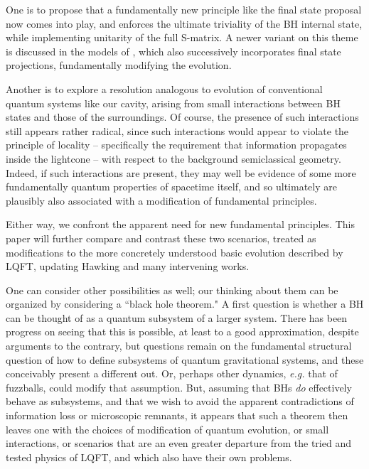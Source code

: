 \documentclass[11pt]{article}
\numberwithin{equation}{section}
\begin{document}
One is to propose that a fundamentally new principle like  the final state proposal\cite{ABL,Griffiths:1984rx,Gell-Mann:1991kdm} now comes into play\cite{HoMa}, and enforces the ultimate triviality of the BH internal state, while implementing unitarity of the full S-matrix.  A newer variant on this theme is discussed in the models of \cite{AEHPV}, which also successively incorporates final state projections, fundamentally modifying the evolution.

Another is to explore a resolution  analogous to evolution of conventional quantum systems like our cavity, arising from small interactions between BH states and those of the surroundings.  Of course, the presence of such interactions still appears rather radical, since such interactions would appear to violate the principle of locality -- specifically the requirement that information propagates inside the lightcone -- with respect to the background semiclassical geometry.  Indeed, if such interactions are present, they may well be evidence of some more fundamentally quantum properties of spacetime itself, and so ultimately are plausibly also associated with a modification of fundamental principles.

Either way, we confront the apparent need for new fundamental principles.  This paper will further compare and contrast 
these two scenarios,  treated as modifications to the more concretely understood basic evolution described by LQFT, updating Hawking\cite{Hawk} and many intervening works.  


One can consider other possibilities as well; our thinking about them can be organized by considering a ``black hole theorem\cite{BHthm}."  A first question is whether a BH can be thought of as a quantum subsystem of a larger system.  There has been progress on seeing that this is possible, at least to a good approximation\cite{DoGi4,SGsplit,SGsub}, despite arguments to the contrary\cite{CGPR}, but questions remain on the fundamental structural question of how to define subsystems of quantum gravitational systems, and these conceivably present a different out.  Or, perhaps other dynamics, {\it e.g.} that of fuzzballs\cite{Fuzzrev}, could modify that assumption.  But, assuming that BHs {\it do} effectively behave as subsystems, and that we wish to avoid the apparent contradictions of information loss or microscopic remnants, it appears that such a theorem then leaves one with the choices of modification of quantum evolution, or small interactions, or scenarios that are an even greater departure from the tried and tested physics of LQFT, and which also have their own problems.
\end{document}
